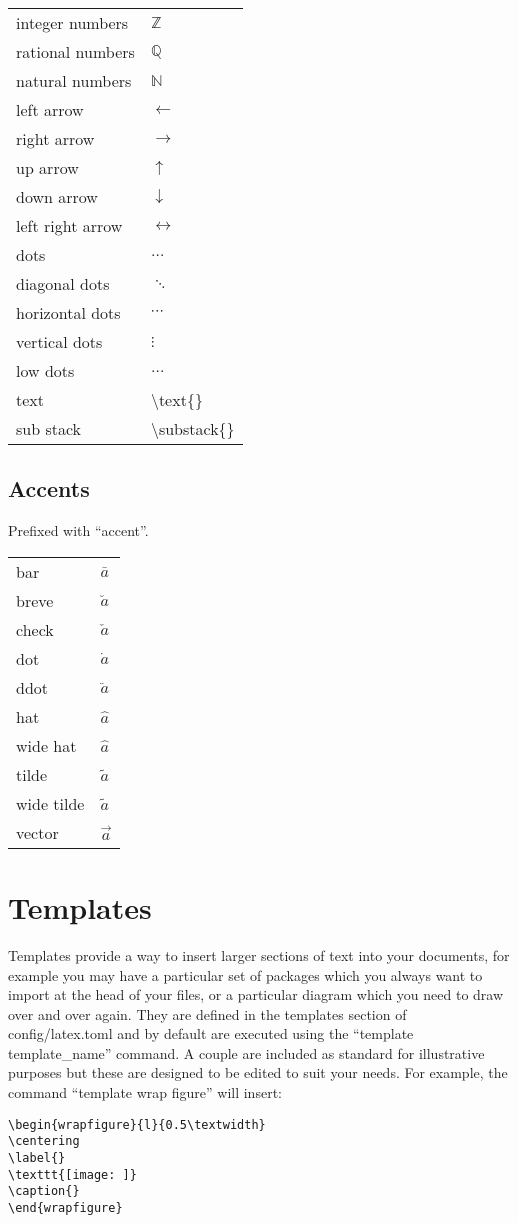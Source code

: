 \documentclass[12pt, a4paper]{article}
\begin{document}
\begin{longtable}{ll}
integer numbers & $\mathbb{Z}$ \\
rational numbers & $\mathbb{Q}$ \\
natural numbers & $\mathbb{N}$ \\
left arrow & $\leftarrow$ \\
right arrow & $\rightarrow$ \\
up arrow & $\uparrow$ \\
down arrow & $\downarrow$ \\
left right arrow & $\leftrightarrow$ \\
dots & $\dots$ \\
diagonal dots & $\ddots$ \\
horizontal dots & $\cdots$ \\
vertical dots & $\vdots$ \\
low dots & $\ldots$ \\
text & \textbackslash text\{\} \\
sub stack & \textbackslash substack\{\} \\
\end{longtable}

\subsection{Accents}
Prefixed with ``accent''.

\begin{longtable}{ll}
bar & $\bar{a}$ \\
breve & $\breve{a}$ \\
check & $\check{a}$ \\
dot & $\dot{a}$ \\
ddot & $\ddot{a}$ \\
hat & $\hat{a}$ \\
wide hat & $\widehat{a}$ \\
tilde & $\tilde{a}$ \\
wide tilde & $\widetilde{a}$ \\
vector & $\vec{a}$ \\
\end{longtable}

\section{Templates}
Templates provide a way to insert larger sections of text into your documents, for example you may have a particular set of packages which you always want to import at the head of your files, or a particular diagram which you need to draw over and over again. They are defined in the templates section of config/latex.toml and by default are executed using the ``template template\_name'' command. A couple are included as standard for illustrative purposes but these are designed to be edited to suit your needs. For example, the command ``template wrap figure'' will insert:

\begin{verbatim}
\begin{wrapfigure}{l}{0.5\textwidth}
\centering
\label{}
\texttt{[image: ]}
\caption{}
\end{wrapfigure}
\end{verbatim}
\end{document}
